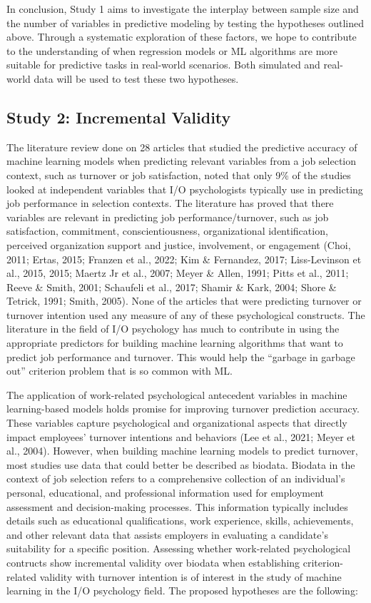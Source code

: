 \documentclass[
  man]{apa7}
\begin{document}
In conclusion, Study 1 aims to investigate the interplay between sample size and the number of variables in predictive modeling by testing the hypotheses outlined above.
Through a systematic exploration of these factors, we hope to contribute to the understanding of when regression models or ML algorithms are more suitable for predictive tasks in real-world scenarios.
Both simulated and real-world data will be used to test these two hypotheses.

\subsection{Study 2: Incremental Validity}\label{study-2-incremental-validity}

The literature review done on 28 articles that studied the predictive accuracy of machine learning models when predicting relevant variables from a job selection context, such as turnover or job satisfaction, noted that only 9\% of the studies looked at independent variables that I/O psychologists typically use in predicting job performance in selection contexts. The literature has proved that there variables are relevant in predicting job performance/turnover, such as job satisfaction, commitment, conscientiousness, organizational identification, perceived organization support and justice, involvement, or engagement (Choi, 2011; Ertas, 2015; Franzen et al., 2022; Kim \& Fernandez, 2017; Liss-Levinson et al., 2015, 2015; Maertz Jr et al., 2007; Meyer \& Allen, 1991; Pitts et al., 2011; Reeve \& Smith, 2001; Schaufeli et al., 2017; Shamir \& Kark, 2004; Shore \& Tetrick, 1991; Smith, 2005). None of the articles that were predicting turnover or turnover intention used any measure of any of these psychological constructs.
The literature in the field of I/O psychology has much to contribute in using the appropriate predictors for building machine learning algorithms that want to predict job performance and turnover.
This would help the ``garbage in garbage out'' criterion problem that is so common with ML.

The application of work-related psychological antecedent variables in machine learning-based models holds promise for improving turnover prediction accuracy.
These variables capture psychological and organizational aspects that directly impact employees' turnover intentions and behaviors (Lee et al., 2021; Meyer et al., 2004). However, when building machine learning models to predict turnover, most studies use data that could better be described as biodata. Biodata in the context of job selection refers to a comprehensive collection of an individual's personal, educational, and professional information used for employment assessment and decision-making processes. This information typically includes details such as educational qualifications, work experience, skills, achievements, and other relevant data that assists employers in evaluating a candidate's suitability for a specific position.
Assessing whether work-related psychological contructs show incremental validity over biodata when establishing criterion-related validity with turnover intention is of interest in the study of machine learning in the I/O psychology field.
The proposed hypotheses are the following:
\end{document}
